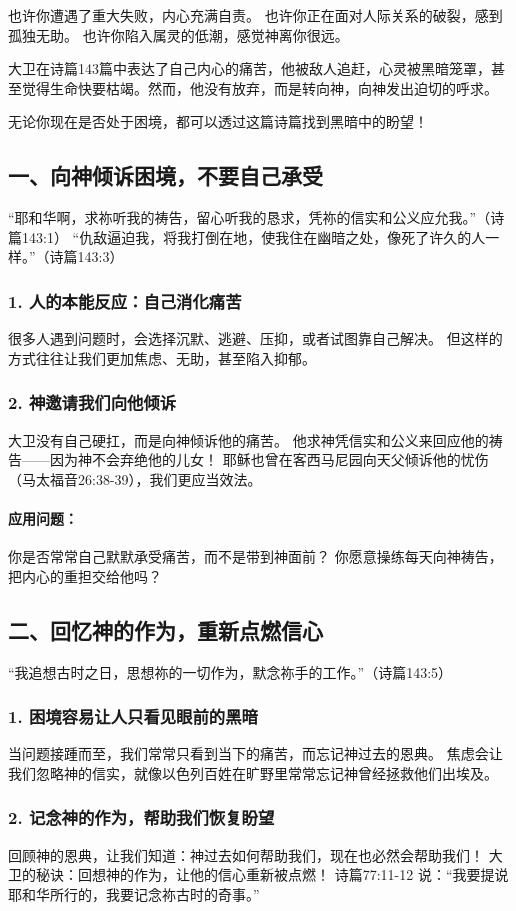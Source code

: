 \documentclass[a4paper, 12pt]{article}
\begin{document}
也许你遭遇了重大失败，内心充满自责。
也许你正在面对人际关系的破裂，感到孤独无助。
也许你陷入属灵的低潮，感觉神离你很远。

大卫在诗篇143篇中表达了自己内心的痛苦，他被敌人追赶，心灵被黑暗笼罩，甚至觉得生命快要枯竭。然而，他没有放弃，而是转向神，向神发出迫切的呼求。

无论你现在是否处于困境，都可以透过这篇诗篇找到黑暗中的盼望！

\subsection*{一、向神倾诉困境，不要自己承受}
“耶和华啊，求祢听我的祷告，留心听我的恳求，凭祢的信实和公义应允我。”（诗篇143:1）
“仇敌逼迫我，将我打倒在地，使我住在幽暗之处，像死了许久的人一样。”（诗篇143:3）

\subsubsection*{1. 人的本能反应：自己消化痛苦}
很多人遇到问题时，会选择沉默、逃避、压抑，或者试图靠自己解决。
但这样的方式往往让我们更加焦虑、无助，甚至陷入抑郁。
\subsubsection*{2. 神邀请我们向他倾诉}
大卫没有自己硬扛，而是向神倾诉他的痛苦。
他求神凭信实和公义来回应他的祷告——因为神不会弃绝他的儿女！
耶稣也曾在客西马尼园向天父倾诉他的忧伤（马太福音26:38-39），我们更应当效法。
\paragraph*{应用问题：}
你是否常常自己默默承受痛苦，而不是带到神面前？
你愿意操练每天向神祷告，把内心的重担交给他吗？
\subsection*{二、回忆神的作为，重新点燃信心}
“我追想古时之日，思想祢的一切作为，默念祢手的工作。”（诗篇143:5）

\subsubsection*{1. 困境容易让人只看见眼前的黑暗}
当问题接踵而至，我们常常只看到当下的痛苦，而忘记神过去的恩典。
焦虑会让我们忽略神的信实，就像以色列百姓在旷野里常常忘记神曾经拯救他们出埃及。
\subsubsection*{2. 记念神的作为，帮助我们恢复盼望}
回顾神的恩典，让我们知道：神过去如何帮助我们，现在也必然会帮助我们！
大卫的秘诀：回想神的作为，让他的信心重新被点燃！
诗篇77:11-12 说：“我要提说耶和华所行的，我要记念祢古时的奇事。”
\end{document}

